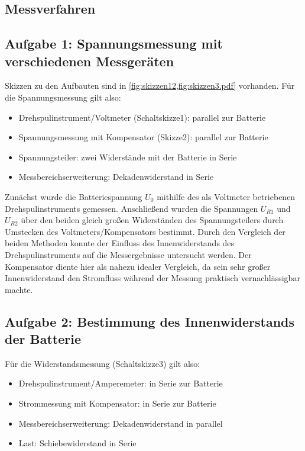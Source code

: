 \subsection{Messverfahren}
\subsection*{\normalsize Aufgabe 1: Spannungsmessung mit verschiedenen Messgeräten}
Skizzen zu den Aufbauten sind in \cref{fig:skizzen12,fig:skizzen3.pdf} vorhanden.
Für die Spannungsmessung gilt also:
\begin{itemize}
    \item Drehspulinstrument/Voltmeter (Schaltskizze1): parallel zur Batterie
    \item Spannungsmessung mit Kompensator (Skizze2): parallel zur Batterie
    \item Spannungsteiler: zwei Widerstände mit der Batterie in Serie 
    \item Messbereichserweiterung: Dekadenwiderstand in Serie
\end{itemize} 
Zunächst wurde die Batteriespannung \(U_0\) mithilfe des als Voltmeter betriebenen Drehspulinstruments gemessen. Anschließend wurden die Spannungen \(U_{R1}\) und \(U_{R2}\) über den beiden gleich großen Widerständen des Spannungsteilers durch Umstecken des Voltmeters/Kompensators bestimmt. Durch den Vergleich der beiden Methoden konnte der Einfluss des Innenwiderstands des Drehspulinstruments auf die Messergebnisse untersucht werden.
Der Kompensator diente hier als nahezu idealer Vergleich, da sein sehr großer Innenwiderstand den Stromfluss während der Messung praktisch vernachlässigbar machte.
\newpage
\subsection*{\normalsize Aufgabe 2: Bestimmung des Innenwiderstands der Batterie}
Für die Widerstandsmessung (Schaltskizze3) gilt also:
\begin{itemize}
    \item Drehspulinstrument/Amperemeter: in Serie zur Batterie
    \item Strommessung mit Kompensator: in Serie zur Batterie
    \item Messbereichserweiterung: Dekadenwiderstand in parallel
    \item Last: Schiebewiderstand in Serie
\end{itemize} 

